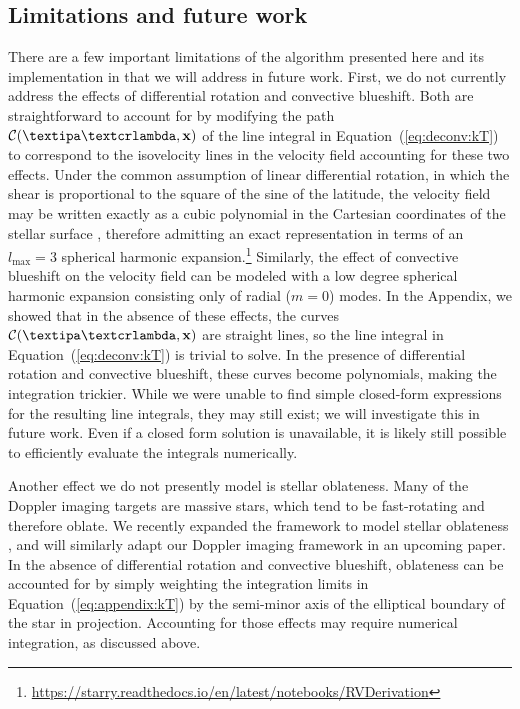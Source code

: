 \documentclass[modern]{aastex631}
\begin{document}
\subsection{Limitations and future work}
\label{sec:discussion:caveats}

There are a few important limitations of the algorithm presented here and its implementation in \starry that we will address in future work.
First, we do not currently address the effects of differential rotation and convective blueshift.
Both are straightforward to account for by modifying the path $\mathcal{C}(\lnlam,\bvec{x})$ of the line integral in Equation~(\ref{eq:deconv:kT}) to correspond to the isovelocity lines in the velocity field accounting for these two effects.
Under the common assumption of linear differential rotation, in which the shear is proportional to the square of the sine of the latitude, the velocity field may be written exactly as a cubic polynomial in the Cartesian coordinates of the stellar surface \citep{Short2018}, therefore admitting an exact representation in terms of an $l_\mathrm{max} = 3$ spherical harmonic expansion.\footnote{\url{https://starry.readthedocs.io/en/latest/notebooks/RVDerivation}}
Similarly, the effect of convective blueshift on the velocity field can be modeled with a low degree spherical harmonic expansion consisting only of radial ($m = 0$) modes.
In the Appendix, we showed that in the absence of these effects, the curves $\mathcal{C}(\lnlam,\bvec{x})$ are straight lines, so the line integral in Equation~(\ref{eq:deconv:kT}) is trivial to solve.
In the presence of differential rotation and convective blueshift, these curves become polynomials, making the integration trickier.
While we were unable to find simple closed-form expressions for the resulting line integrals, they may still exist; we will investigate this in future work.
Even if a closed form solution is unavailable, it is likely still possible to efficiently evaluate the integrals numerically.

Another effect we do not presently model is stellar oblateness.
Many of the Doppler imaging targets are massive stars, which tend to be fast-rotating and therefore oblate.
We recently expanded the \starry framework to model stellar oblateness \citet{Dholakia2021}, and will similarly adapt our Doppler imaging framework in an upcoming paper. 
In the absence of differential rotation and convective blueshift, oblateness can be accounted for by simply weighting the integration limits in Equation~(\ref{eq:appendix:kT}) by the semi-minor axis of the elliptical boundary of the star in projection. 
Accounting for those effects may require numerical integration, as discussed above.
\end{document}
